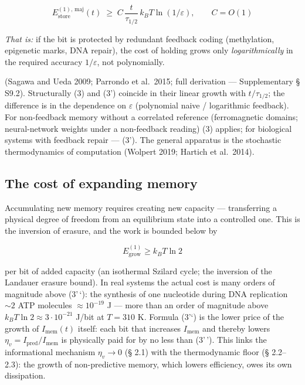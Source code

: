 \documentclass[pdflatex,sn-mathphys-ay]{sn-jnl}
\begin{document}
\begin{equation}E_{\text{store}}^{(1),\,\text{maj}}(t) \;\ge\; C\,\frac{t}{\tau_{1/2}}\, k_B T \ln(1/\varepsilon), \qquad C = O(1) \tag{3'}\end{equation}



\emph{That is:} if the bit is protected by redundant feedback coding (methylation, epigenetic marks, DNA repair), the cost of holding grows only \emph{logarithmically} in the required accuracy \(1/\varepsilon\), not polynomially.



(Sagawa and Ueda 2009; Parrondo et al.~2015; full derivation --- Supplementary § S9.2). Structurally (3) and (3') coincide in their linear growth with \(t/\tau_{1/2}\); the difference is in the dependence on \(\varepsilon\) (polynomial naive / logarithmic feedback). For non-feedback memory without a correlated reference (ferromagnetic domains; neural-network weights under a non-feedback reading) (3) applies; for biological systems with feedback repair --- (3'). The general apparatus is the stochastic thermodynamics of computation (Wolpert 2019; Hartich et al.~2014).



\subsection{The cost of expanding memory}\label{the-cost-of-expanding-memory}



Accumulating new memory requires creating new capacity --- transferring a physical degree of freedom from an equilibrium state into a controlled one. This is the inversion of erasure, and the work is bounded below by



\begin{equation}E_{\text{grow}}^{(1)} \ge k_B T \ln 2 \tag{3''}\end{equation}



per bit of added capacity (an isothermal Szilard cycle; the inversion of the Landauer erasure bound). In real systems the actual cost is many orders of magnitude above (3'\,`): the synthesis of one nucleotide during DNA replication \(\sim 2\) ATP molecules \(\approx 10^{-19}\) J --- more than an order of magnitude above \(k_B T \ln 2 \approx 3\cdot10^{-21}\) J/bit at \(T = 310\) K. Formula (3'`) is the lower price of the growth of \(I_{\text{mem}}(t)\) itself: each bit that increases \(I_{\text{mem}}\) and thereby lowers \(\eta_v = I_{\text{pred}}/I_{\text{mem}}\) is physically paid for by no less than (3'\,'). This links the informational mechanism \(\eta_v \to 0\) (§ 2.1) with the thermodynamic floor (§ 2.2--2.3): the growth of non-predictive memory, which lowers efficiency, owes its own dissipation.
\end{document}
